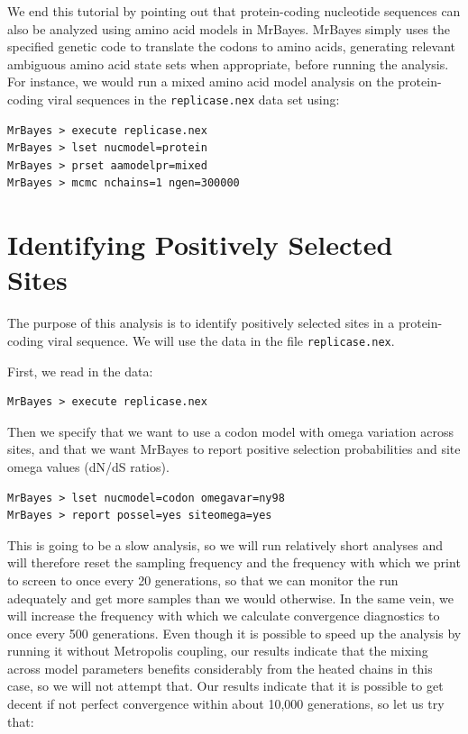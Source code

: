 \documentclass[12pt]{book}
\newcommand{\ttt}[1]{\texttt{#1}}
\begin{document}
We end this tutorial by pointing out that protein-coding nucleotide sequences can also be analyzed
using amino acid models in MrBayes. MrBayes simply uses the specified genetic code to translate the
codons to amino acids, generating relevant ambiguous amino acid state sets when appropriate, before
running the analysis. For instance, we would run a mixed amino acid model analysis on the
protein-coding viral sequences in the \ttt{replicase.nex} data set using:

\begin{singlespacing}\small
\begin{verbatim}
MrBayes > execute replicase.nex
MrBayes > lset nucmodel=protein
MrBayes > prset aamodelpr=mixed
MrBayes > mcmc nchains=1 ngen=300000
\end{verbatim}
\normalsize
\end{singlespacing}

\section{Identifying Positively Selected Sites}

The purpose of this analysis is to identify positively selected sites in a protein-coding viral
sequence. We will use the data in the file \ttt{replicase.nex}.

First, we read in the data:

\begin{singlespacing}\small
\begin{verbatim}
MrBayes > execute replicase.nex
\end{verbatim}
\normalsize
\end{singlespacing}

Then we specify that we want to use a codon model with omega variation across sites, and that we
want MrBayes to report positive selection probabilities and site omega values (dN/dS ratios).

\begin{singlespacing}\small
\begin{verbatim}
MrBayes > lset nucmodel=codon omegavar=ny98
MrBayes > report possel=yes siteomega=yes
\end{verbatim}
\normalsize
\end{singlespacing}

This is going to be a slow analysis, so we will run relatively short analyses and will therefore
reset the sampling frequency and the frequency with which we print to screen to once every 20
generations, so that we can monitor the run adequately and get more samples than we would
otherwise. In the same vein, we will increase the frequency with which we calculate convergence
diagnostics to once every 500 generations. Even though it is possible to speed up the analysis by
running it without Metropolis coupling, our results indicate that the mixing across model
parameters benefits considerably from the heated chains in this case, so we will not attempt that.
Our results indicate that it is possible to get decent if not perfect convergence within about
10,000 generations, so let us try that:
\end{document}
